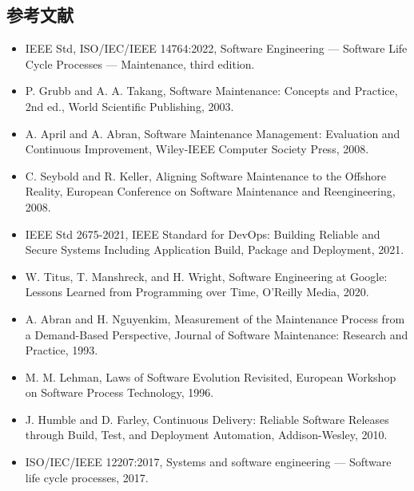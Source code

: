 \subsection{参考文献}
\begin{itemize}
\item IEEE Std, ISO/IEC/IEEE 14764:2022, Software Engineering — Software Life Cycle Processes — Maintenance, third edition.
\item P. Grubb and A. A. Takang, Software Maintenance: Concepts and Practice, 2nd ed., World Scientific Publishing, 2003.
\item A. April and A. Abran, Software Maintenance Management: Evaluation and Continuous Improvement, Wiley-IEEE Computer Society Press, 2008.
\item C. Seybold and R. Keller, Aligning Software Maintenance to the Offshore Reality, European Conference on Software Maintenance and Reengineering, 2008.
\item IEEE Std 2675-2021, IEEE Standard for DevOps: Building Reliable and Secure Systems Including Application Build, Package and Deployment, 2021.
\item W. Titus, T. Manshreck, and H. Wright, Software Engineering at Google: Lessons Learned from Programming over Time, O’Reilly Media, 2020.
\item A. Abran and H. Nguyenkim, Measurement of the Maintenance Process from a Demand-Based Perspective, Journal of Software Maintenance: Research and Practice, 1993.
\item M. M. Lehman, Laws of Software Evolution Revisited, European Workshop on Software Process Technology, 1996.
\item J. Humble and D. Farley, Continuous Delivery: Reliable Software Releases through Build, Test, and Deployment Automation, Addison-Wesley, 2010.
\item ISO/IEC/IEEE 12207:2017, Systems and software engineering — Software life cycle processes, 2017.
\end{itemize}
